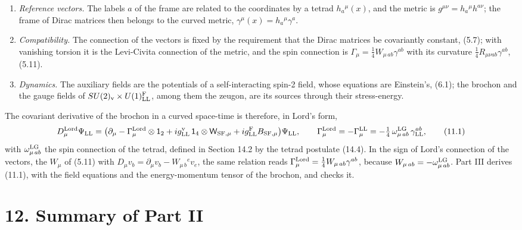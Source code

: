 \documentclass[
  10pt,
]{article}
\providecommand{\tightlist}{%
  \setlength{\itemsep}{0pt}\setlength{\parskip}{0pt}}
\begin{document}
\begin{enumerate}
\def\labelenumi{\arabic{enumi}.}
\tightlist
\item
  \emph{Reference vectors.} The labels \(a\) of the frame are related to
  the coordinates by a tetrad \(h_a{}^\mu(x)\), and the metric is
  \(g^{\mu\nu}=h_a{}^\mu h^{a\nu}\); the frame of Dirac matrices then
  belongs to the curved metric, \(\gamma^\mu(x)=h_a{}^\mu\gamma^a\).
\item
  \emph{Compatibility.} The connection of the vectors is fixed by the
  requirement that the Dirac matrices be covariantly constant, (5.7);
  with vanishing torsion it is the Levi-Civita connection of the metric,
  and the spin connection is
  \(\Gamma_\mu=\tfrac14W_{\mu\,ab}\gamma^{ab}\) with its curvature
  \(\tfrac14R_{\mu\nu ab}\gamma^{ab}\), (5.11).
\item
  \emph{Dynamics.} The auxiliary fields are the potentials of a
  self-interacting spin-2 field, whose equations are Einstein's, (6.1);
  the brochon and the gauge fields of
  \(SU(2)_{\rm v}\times U(1)^{\rm F}_{\rm LL}\), among them the zeugon,
  are its sources through their stress-energy.
\end{enumerate}

The covariant derivative of the brochon in a curved space-time is
therefore, in Lord's form,
\[D^{\rm Lord}_\mu\Psi_{\rm LL}=\big(\partial_\mu-\Gamma^{\rm Lord}_\mu\otimes\mathsf 1_2+ig^{\rm v}_{\rm LL}\,\mathsf 1_4\otimes\mathsf W_{{\rm SF},\mu}+ig^{\rm F}_{\rm LL}B_{{\rm SF},\mu}\big)\Psi_{\rm LL},\qquad
\Gamma^{\rm Lord}_\mu=-\Gamma^{\rm LL}_\mu=-\tfrac14\,\omega^{\rm LG}_{\mu\,ab}\,\gamma^{ab}_{\rm LL},\tag{11.1}\]
with \(\omega^{\rm LG}_{\mu\,ab}\) the spin connection of the tetrad,
defined in Section 14.2 by the tetrad postulate (14.4). In the sign of
Lord's connection of the vectors, the \(W_\mu\) of (5.11) with
\(D_\mu v_b=\partial_\mu v_b-W_{\mu\,b}{}^ev_e\), the same relation
reads \(\Gamma^{\rm Lord}_\mu=\tfrac14W_{\mu\,ab}\gamma^{ab}\), because
\(W_{\mu\,ab}=-\omega^{\rm LG}_{\mu\,ab}\). Part III derives (11.1),
with the field equations and the energy-momentum tensor of the brochon,
and checks it.

\hypertarget{summary-of-part-ii}{%
\section{12. Summary of Part II}\label{summary-of-part-ii}}
\end{document}
